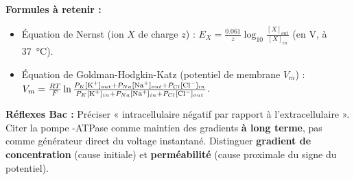\documentclass[11pt]{article}
\begin{document}
\begin{methode}
\textbf{Formules à retenir :}
\begin{itemize}
    \item Équation de Nernst (ion $X$ de charge $z$) : $E_X = \frac{0.061}{z} \log_{10} \frac{[X]_{out}}{[X]_{in}}$ (en V, à \SI{37}{\celsius}).
    \item Équation de Goldman-Hodgkin-Katz (potentiel de membrane $V_m$) : $V_m = \frac{RT}{F} \ln \frac{P_K[\ce{K+}]_{out} + P_{Na}[\ce{Na+}]_{out} + P_{Cl}[\ce{Cl-}]_{in}}{P_K[\ce{K+}]_{in} + P_{Na}[\ce{Na+}]_{in} + P_{Cl}[\ce{Cl-}]_{out}}$.
\end{itemize}

\textbf{Réflexes Bac :} Préciser « intracellulaire négatif par rapport à l'extracellulaire ». Citer la pompe -ATPase comme maintien des gradients \textbf{à long terme}, pas comme générateur direct du voltage instantané. Distinguer \textbf{gradient de concentration} (cause initiale) et \textbf{perméabilité} (cause proximale du signe du potentiel).
\end{methode}
\end{document}
